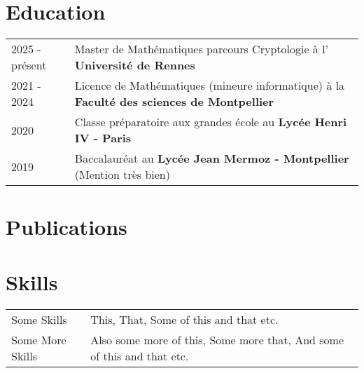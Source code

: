 \documentclass[a4paper,12pt]{article}
\begin{document}
\section{Education}
\begin{tabularx}{\linewidth}{@{}l X@{}}	


2025 - présent & Master de Mathématiques parcours Cryptologie à l' \textbf{Université de Rennes} \hfill  \\ 

2021 - 2024 & Licence de Mathématiques (mineure informatique) à la \textbf{Faculté des sciences de Montpellier} \hfill   \\

2020 & Classe préparatoire aux grandes école au \textbf{Lycée Henri IV - Paris} \hfill   \\

2019 & Baccalauréat au \textbf{Lycée Jean Mermoz - Montpellier} \hfill (Mention très bien)
\end{tabularx}

\section{Publications}
\begin{refsection}
\nocite{*}
\printbibliography[heading=none]
\end{refsection}

\section{Skills}
\begin{tabularx}{\linewidth}{@{}l X@{}}
Some Skills &  \normalsize{This, That, Some of this and that etc.}\\
Some More Skills  &  \normalsize{Also some more of this, Some more that, And some of this and that etc.}\\  
\end{tabularx}

\vfill
{}
\end{document}
